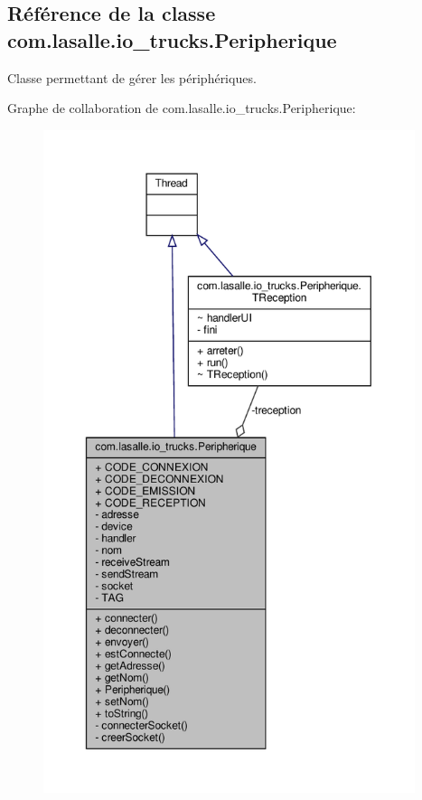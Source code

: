 \hypertarget{classcom_1_1lasalle_1_1io__trucks_1_1_peripherique}{}\subsection{Référence de la classe com.\+lasalle.\+io\+\_\+trucks.\+Peripherique}
\label{classcom_1_1lasalle_1_1io__trucks_1_1_peripherique}


Classe permettant de gérer les périphériques.  




Graphe de collaboration de com.\+lasalle.\+io\+\_\+trucks.\+Peripherique\+:
\nopagebreak
\begin{figure}[H]
\begin{center}
\leavevmode
\includegraphics[height=550pt]{classcom_1_1lasalle_1_1io__trucks_1_1_peripherique__coll__graph}
\end{center}
\end{figure}
